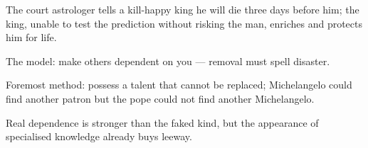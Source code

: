 

\begin{distilled}
  \item The court astrologer tells a kill-happy king he will die three days before him; the king, unable to test the prediction without risking the man, enriches and protects him for life.
  \item The model: make others dependent on you --- removal must spell disaster.
  \item Foremost method: possess a talent that cannot be replaced; Michelangelo could find another patron but the pope could not find another Michelangelo.
  \item Real dependence is stronger than the faked kind, but the appearance of specialised knowledge already buys leeway.
\end{distilled}
